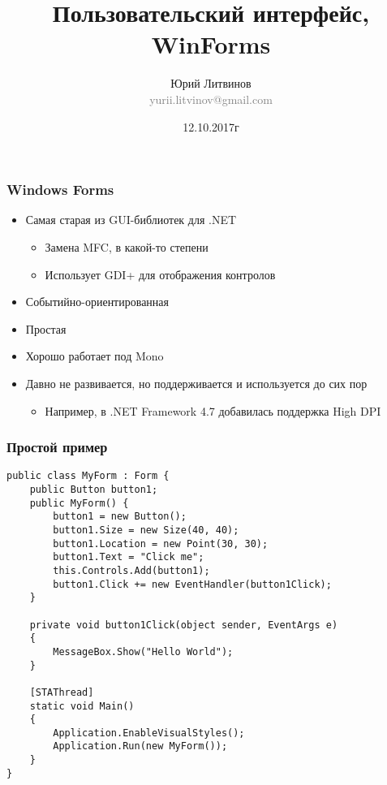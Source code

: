 \documentclass[xetex,mathserif,serif]{beamer}
\title{Пользовательский интерфейс, WinForms}
\author[Юрий Литвинов]{Юрий Литвинов\\\small{\textcolor{gray}{yurii.litvinov@gmail.com}}}
\date{12.10.2017г}
\begin{document}
	\frame{\titlepage}

	\begin{frame}
		\frametitle{Windows Forms}
		\begin{itemize}
			\item Самая старая из GUI-библиотек для .NET
			\begin{itemize}
				\item Замена MFC, в какой-то степени
				\item Использует GDI+ для отображения контролов
			\end{itemize}
			\item Событийно-ориентированная
			\item Простая
			\item Хорошо работает под Mono
			\item Давно не развивается, но поддерживается и используется до сих пор
			\begin{itemize}
				\item Например, в .NET Framework 4.7 добавилась поддержка High DPI
			\end{itemize}
		\end{itemize}
	\end{frame}

	\begin{frame}[fragile]
		\frametitle{Простой пример}
		\begin{scriptsize}
			\begin{verbatim}
public class MyForm : Form {
    public Button button1;
    public MyForm() {
        button1 = new Button();
        button1.Size = new Size(40, 40);
        button1.Location = new Point(30, 30);
        button1.Text = "Click me";
        this.Controls.Add(button1);
        button1.Click += new EventHandler(button1Click);
    }

    private void button1Click(object sender, EventArgs e)
    {
        MessageBox.Show("Hello World");
    }

    [STAThread]
    static void Main()
    {
        Application.EnableVisualStyles();
        Application.Run(new MyForm());
    }
}
			\end{verbatim}
		\end{scriptsize}
	\end{frame}
\end{document}
